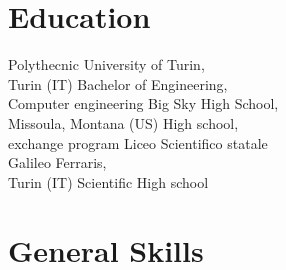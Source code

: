 \documentclass[%
               doublesided,
               paper=a4,
               fontsize=10pt
              ]{my-resume}
\begin{document}
{    \section[\faMortarBoard]{Education}
        {Polythecnic University of Turin, \\Turin (IT)}
        {Bachelor of Engineering,\\Computer engineering}
        {}
        {Big Sky High School, \\Missoula, Montana (US)}
        {High school,\\ exchange program}
        {}
        {Liceo Scientifico statale\\ Galileo Ferraris,\\ Turin (IT)}
        {Scientific High school}
        {}


    \section{General Skills}
    \smallskip %
    
    
}
\makebody
\clearpage


\end{document}
